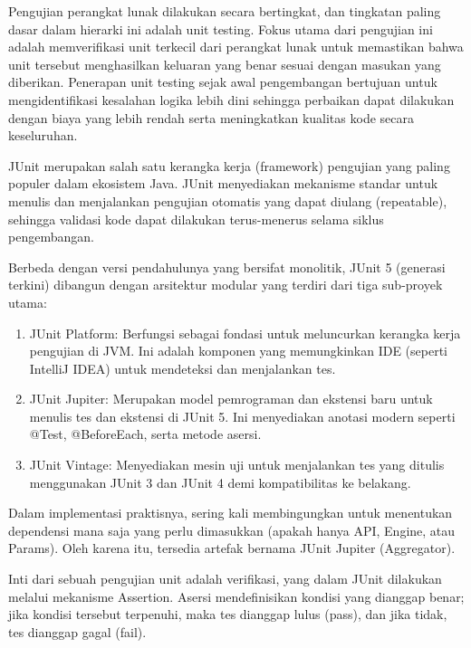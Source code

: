 \documentclass[a4paper,12pt]{article}
\begin{document}
\begin{sloppypar}
Pengujian perangkat lunak dilakukan secara bertingkat, dan tingkatan paling dasar dalam hierarki ini adalah unit testing. Fokus utama dari pengujian ini adalah memverifikasi unit terkecil dari perangkat lunak untuk memastikan bahwa unit tersebut menghasilkan keluaran yang benar sesuai dengan masukan yang diberikan. Penerapan unit testing sejak awal pengembangan bertujuan untuk mengidentifikasi kesalahan logika lebih dini sehingga perbaikan dapat dilakukan dengan biaya yang lebih rendah serta meningkatkan kualitas kode secara keseluruhan.

JUnit merupakan salah satu kerangka kerja (framework) pengujian yang paling populer dalam ekosistem Java. JUnit menyediakan mekanisme standar untuk menulis dan menjalankan pengujian otomatis yang dapat diulang (repeatable), sehingga validasi kode dapat dilakukan terus-menerus selama siklus pengembangan.

Berbeda dengan versi pendahulunya yang bersifat monolitik, JUnit 5 (generasi terkini) dibangun dengan arsitektur modular yang terdiri dari tiga sub-proyek utama:

\begin{enumerate}
    \item JUnit Platform: Berfungsi sebagai fondasi untuk meluncurkan kerangka kerja pengujian di JVM. Ini adalah komponen yang memungkinkan IDE (seperti IntelliJ IDEA) untuk mendeteksi dan menjalankan tes.

    \item JUnit Jupiter: Merupakan model pemrograman dan ekstensi baru untuk menulis tes dan ekstensi di JUnit 5. Ini menyediakan anotasi modern seperti @Test, @BeforeEach, serta metode asersi.

    \item JUnit Vintage: Menyediakan mesin uji untuk menjalankan tes yang ditulis menggunakan JUnit 3 dan JUnit 4 demi kompatibilitas ke belakang.
\end{enumerate}

Dalam implementasi praktisnya, sering kali membingungkan untuk menentukan dependensi mana saja yang perlu dimasukkan (apakah hanya API, Engine, atau Params). Oleh karena itu, tersedia artefak bernama JUnit Jupiter (Aggregator).

Inti dari sebuah pengujian unit adalah verifikasi, yang dalam JUnit dilakukan melalui mekanisme Assertion. Asersi mendefinisikan kondisi yang dianggap benar; jika kondisi tersebut terpenuhi, maka tes dianggap lulus (pass), dan jika tidak, tes dianggap gagal (fail).


\end{sloppypar}
\end{document}
